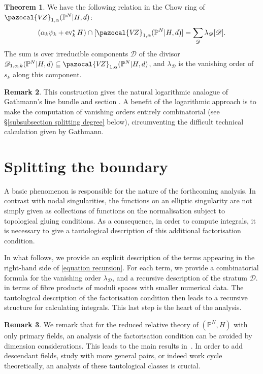 \documentclass[11pt]{amsart}
\newcommand{\PP}{\mathbb P}
\newcommand{\VZ}{\pazocal{V\!Z}}
\newcommand{\st}{\star}
\newcommand{\ev}{\operatorname{ev}}
\newcommand{\Dcal}{\mathcal{D}}
\theoremstyle{definition}
\newtheorem{thm}{Theorem}[section]
\theoremstyle{definition}
\newtheorem{remark}[thm]{Remark}
\begin{document}
\begin{thm} \label{theorem recursion} We have the following relation in the Chow ring of $\VZ_{1,\alpha}(\PP^N|H,d)$:
\begin{equation}\label{equation recursion} (\alpha_k \psi_k + \ev_k^\st H) \cap [\VZ_{1,\alpha}(\PP^N|H,d)] = \sum_{\Dcal} \lambda_\Dcal [ \Dcal ].\end{equation}
The sum is over irreducible components $\Dcal$ of the divisor $\Dcal_{1,\alpha,k}(\PP^N|H,d) \subseteq \VZ_{1,\alpha}(\PP^N|H,d)$, and $\lambda_\Dcal$ is the vanishing order of $s_k$ along this component. \end{thm}

\begin{remark} This construction gives the natural logarithmic analogue of Gathmann's line bundle and section \cite[Construction 2.1]{Ga}. A benefit of the logarithmic approach is to make the computation of vanishing orders entirely combinatorial (see \S \ref{subsubsection splitting degree} below), circumventing the difficult technical calculation given by Gathmann. \end{remark}

\section{Splitting the boundary}\label{section reduced splitting}

A basic phenomenon is responsible for the nature of the forthcoming analysis. In contrast with nodal singularities, the functions on an elliptic singularity are not simply given as collections of functions on the normalisation subject to topological gluing conditions. As a consequence, in order to compute integrals, it is necessary to give a tautological description of this additional factorisation condition. 

In what follows, we provide an explicit description of the terms appearing in the right-hand side of \eqref{equation recursion}.  For each term, we provide a combinatorial formula for the vanishing order $\lambda_\Dcal$, and a recursive description of the stratum $\Dcal$. 
in terms of fibre products of moduli spaces with smaller numerical data. The tautological description of the factorisation condition then leads to a recursive structure for calculating integrals. This last step is the heart of the analysis. 

\begin{remark}
We remark that for the reduced relative theory of $(\mathbb P^N,H)$ with only primary fields, an analysis of the factorisation condition can be avoided by dimension considerations. This leads to the main results in~\cite{Vre}. In order to add descendant fields, study with more general pairs, or indeed work cycle theoretically, an analysis of these tautological classes is crucial. 
\end{remark}
\end{document}
